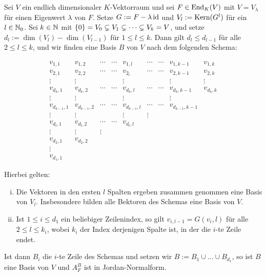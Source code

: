 \begin{satz}
	\label{satz:9.18}
	Sei $V$ ein endlich dimensionaler $K$-Vektorraum und sei $F \in \operatorname{End}_K(V)$ mit $V = V_\lambda$ für einen Eigenwert $\lambda$ von $F$.
	Setze $G := F - \lambda \operatorname{id}$ und $V_l := \operatorname{Kern}(G^{l})$ für ein $l \in \mathbb{N}_0$.
	Sei $k \in \mathbb{N}$ mit $\{0\} = V_0 \subsetneq V_1 \subsetneq \cdots \subsetneq V_k = V$,	und setze $d_l := \dim(V_l) - \dim(V_{l-1})$ für $1 \leq l \leq k$.
	Dann gilt $d_l \leq d_{l-1}$ für alle $2 \leq l \leq k$, und wir finden eine Basis $B$ von $V$ nach dem folgenden Schema:
	
	\[ \begin{array}{ccccccccc}
		v_{1,1} & v_{1,2} & \cdots & \cdots & v_{1,l} & \cdots & \cdots & v_{1,k-1} & v_{1,k} \\ 
		v_{2,1} & v_{2,2} & \cdots & \cdots & v_{2_l} & \cdots & \cdots & v_{2,k-1} & v_{2,k} \\ 
		\vdots & \vdots &  &  & \vdots &  &  & \vdots & \vdots \\ 
		v_{d_k,1} & v_{d_k,2} & \cdots & \cdots & v_{d_k,l} & \cdots & \cdots & v_{d_k,k-1} & v_{d_k,k} \\ 
		\vdots & \vdots &  &  & \vdots &  &  & \vdots &  \\ 
		v_{d_{k-1},1} & v_{d_{k-1},2} & \cdots & \cdots & v_{d_{k-1},l} & \cdots & \cdots & v_{d_{k-1},k-1} &  \\ 
		\vdots & \vdots &  &  & \vdots & \vdots &  &  &  \\ 
		v_{d_l,1} & v_{d_l,2} & \cdots & \cdots & v_{d_l,l} &  &  &  &  \\ 
		\vdots & \vdots & \vdots &  &  &  &  &  &  \\ 
		v_{d_2,1} & v_{d_2,2} &  &  &  &  &  &  &  \\
		\vdots & & & & & & & & \\ 
		v_{d_1,1} &  &  &  &  &  &  &  & 
	\end{array}
	\]
	
	Hierbei gelten:
	\begin{enumerate}[(i)]
		\item Die Vektoren in den ersten $l$ Spalten ergeben zusammen genommen eine Basis von $V_l$.
		Insbesondere bilden alle Bektoren des Schemas eine Basis von $V$.
		\item Ist $1 \leq i \leq d_1$ ein beliebiger Zeilenindex, so gilt $v_{i,l-1} = G(v_i,l)$ für alle $2 \leq l \leq k_i$, wobei $k_i$ der Index derjenigen Spalte ist, in der die $i$-te Zeile endet.
	\end{enumerate}
	Ist dann $B_i$ die $i$-te Zeile des Schemas und setzen wir $B := B_1 \cup \dots \cup B_{d_1}$, so ist $B$ eine Basis von $V$ und $A^B_F$ ist in Jordan-Normalform.
\end{satz}


